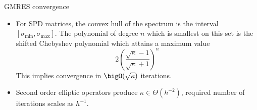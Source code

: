 \begin{frame}{GMRES convergence}
  \begin{itemize}
    \begin{theorem}\label{thm:gmres-diag}
      For the GMRES iteration applied to a diagonalizable matrix $A = V\Lambda V^{-1}$
      \begin{equation*}
        \frac{\norm{r_n}}{\norm{r_0}}
        \le \kappa(V) \inf_{\substack{p_n \in P_n \\ p_n(0) = 1}} \norm{p_n}_\Lambda
      \end{equation*}
      where $P_n$ is the space of polynomials of degree at most $n$.
    \end{theorem}
    \item For SPD matrices, the convex hull of the spectrum is the interval $[\sigma_{\text{min}},\sigma_{\text{max}}]$.  The polynomial of degree $n$ which is smallest on this set is the shifted Chebyshev polynomial which attains a maximum value
\[ 2 \left(\frac{\sqrt\kappa-1}{\sqrt\kappa+1}\right)^n \]
This implies convergence in $\bigO(\sqrt{\kappa})$ iterations.
\item \alert<2->{Second order elliptic operators produce $\kappa \in \Theta(h^{-2})$, required number of iterations scales as $h^{-1}$.}
\end{itemize}
\end{frame}
